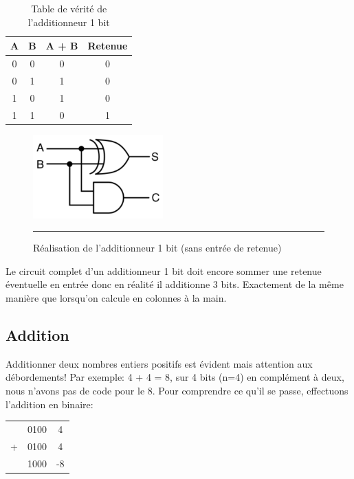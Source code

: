 \begin{table}[!htbp]
\begin{center}
{\selectfont
\begin{tabular}{|c|c|c|c|}
\hline 
A & B & A + B & Retenue\\
\hline  
\hline 
0 & 0 & 0 & 0\\
\hline 
0 & 1 & 1 & 0\\
\hline
1 & 0 & 1 & 0\\
\hline
1 & 1 & 0 & 1\\
\hline
\end{tabular}
}
\end{center}
\caption{Table de vérité de l'additionneur 1 bit \label{add 1 bit}}
\end{table}

\begin{figure}[htb]
  \centering
  \includegraphics[width=5cm]{./Figures/arith/Half-adder.pdf}
  \rule{35em}{0.5pt}
  \caption[half_adder]{Réalisation de l'additionneur 1 bit (sans entrée de retenue)}
  \label{fig:half_adder}
\end{figure}

Le circuit complet d'un additionneur 1 bit doit encore sommer une retenue éventuelle en entrée donc en réalité il additionne 3 bits. Exactement de la même manière que lorsqu'on calcule en colonnes à la main.

\subsection{Addition}
Additionner deux nombres entiers positifs est évident mais attention aux débordements! Par exemple: 4 + 4 = 8, sur 4 bits (n=4) en complément à deux, nous n'avons pas de code pour le 8. Pour comprendre ce qu'il se passe, effectuons l'addition en binaire:

\begin{center}
{\selectfont
\begin{tabular}{c c c}
  & 0100 & 4 \\
+ & 0100 & 4 \\
\hline
  & 1000 & -8 \\
\end{tabular}
}
\end{center}

